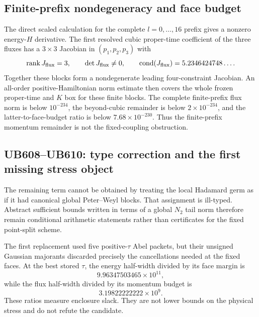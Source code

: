 \documentclass[11pt]{article}
\theoremstyle{definition}
\theoremstyle{remark}
\newcommand{\rank}{\operatorname{rank}}
\begin{document}
\subsection{Finite-prefix nondegeneracy and face budget}

The direct scaled calculation for the complete $l=0,\ldots,16$ prefix gives a nonzero energy-$H$ derivative. The first resolved cubic proper-time coefficient of the three fluxes has a $3\times3$ Jacobian in $(p_1,p_2,p_3)$ with
\begin{equation}
 \rank J_{\rm flux}=3,
 \qquad \det J_{\rm flux}\ne0,
 \qquad \operatorname{cond}(J_{\rm flux})=5.2346424748\ldots .
\end{equation}
Together these blocks form a nondegenerate leading four-constraint Jacobian. An all-order positive-Hamiltonian norm estimate then covers the whole frozen proper-time and $K$ box for these finite blocks. The complete finite-prefix flux norm is below $10^{-234}$, the beyond-cubic remainder is below $2\times10^{-234}$, and the latter-to-face-budget ratio is below $7.68\times10^{-230}$. Thus the finite-prefix momentum remainder is not the fixed-coupling obstruction.

\subsection{UB608--UB610: type correction and the first missing stress object}

The remaining term cannot be obtained by treating the local Hadamard germ as if it had canonical global Peter--Weyl blocks. That assignment is ill-typed. Abstract sufficient bounds written in terms of a global $N_2$ tail norm therefore remain conditional arithmetic statements rather than certificates for the fixed point-split scheme.

The first replacement used five positive-$\tau$ Abel packets, but their unsigned Gaussian majorants discarded precisely the cancellations needed at the fixed faces. At the best stored $\tau$, the energy half-width divided by its face margin is
\begin{equation}
 9.96347503465\times10^{11},
\end{equation}
while the flux half-width divided by its momentum budget is
\begin{equation}
 3.19822222222\times10^9.
\end{equation}
These ratios measure enclosure slack. They are not lower bounds on the physical stress and do not refute the candidate.
\end{document}
